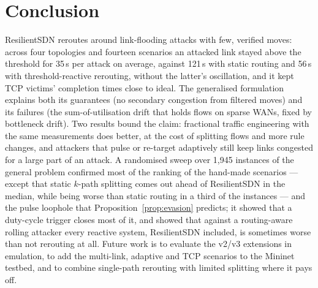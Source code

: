 \section{Conclusion}
ResilientSDN reroutes around link-flooding attacks with few, verified moves: across four topologies
and fourteen scenarios an attacked link stayed above the threshold for 35\,s per attack on average,
against 121\,s with static routing and 56\,s with threshold-reactive rerouting, without the latter's
oscillation, and it kept TCP victims' completion times close to ideal. The generalised formulation explains both its guarantees (no secondary congestion
from filtered moves) and its failures (the sum-of-utilisation drift that holds flows on sparse WANs,
fixed by bottleneck drift). Two results bound the claim: fractional traffic engineering with the same
measurements does better, at the cost of splitting flows and more rule changes, and attackers that pulse
or re-target adaptively still keep links congested for a large part of an attack. A randomised sweep
over 1{,}945 instances of the general problem confirmed most of the ranking of the hand-made scenarios
--- except that static $k$-path splitting comes out ahead of ResilientSDN in the median, while being
worse than static routing in a third of the instances --- and the pulse loophole that
Proposition~\ref{prop:evasion} predicts; it showed that a duty-cycle trigger closes
most of it, and showed that against a routing-aware rolling attacker every reactive system,
ResilientSDN included, is sometimes worse than not rerouting at all. Future work is to
evaluate the v2/v3 extensions in emulation, to add the multi-link, adaptive and TCP scenarios to the
Mininet testbed, and to combine single-path rerouting with limited splitting where it pays off.
